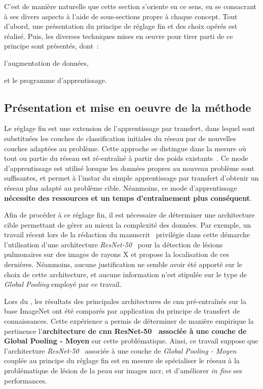 C'est de manière naturelle que cette section s'oriente en ce sens, en se consacrant à ses divers aspects à l'aide de sous-sections propre à chaque concept. Tout d'abord, une présentation du principe de réglage fin et des choix opérés est réalisé. Puis, les diverses techniques mises en œuvre pour tirer parti de ce principe sont présentés, dont~:
\begin{inlinerate}
    \item l'augmentation de données,
    \item et le programme d'apprentissage.
\end{inlinerate}\par

\subsection{Présentation et mise en oeuvre de la méthode}
Le réglage fin est une extension de l'apprentissage par transfert, dans lequel sont substituées les couches de classification initiales du réseau par de nouvelles couches adaptées au problème. Cette approche se distingue dans la mesure où tout ou partie du réseau est ré-entraîné à partir des poids existants~\cite{Tajbakhsh2016}. Ce mode d'apprentissage est utilisé lorsque les données propres au nouveau problème sont suffisantes, et permet à l'instar du simple apprentissage par transfert d'obtenir un réseau plus adapté au problème cible. Néanmoins, ce mode d'apprentissage \textbf{nécessite des ressources et un temps d'entraînement plus conséquent}.\par

Afin de procéder à ce réglage fin, il est nécessaire de déterminer une architecture cible permettant de gérer au mieux la complexité des données. Par exemple, un travail récent lors de la rédaction du manuscrit~\cite{Park2019} privilégie dans cette démarche l'utilisation d'une architecture \textit{ResNet-50}~\cite{He2016} pour la détection de lésions pulmonaires sur des images de rayons X et propose la localisation de ces dernières. Néanmoins, aucune justification ne semble avoir été apporté sur le choix de cette architecture, et aucune information n'est stipulée sur le type de \textit{Global Pooling} employé par ce travail.\par

Lors du , les résultats des principales architectures de \gls{cnn} pré-entraînés sur la base ImageNet ont été comparés par application du principe de transfert de connaissances. Cette expérience a permis de déterminer de manière empirique la pertinence l'\textbf{architecture de \gls{cnn} ResNet-50~\cite{He2016} associée à une couche de Global Pooling - Moyen} sur cette problématique. Ainsi, ce travail suppose que l'architecture \textit{ResNet-50}~\cite{He2016} associée à une couche de \textit{Global Pooling - Moyen} couplée au principe du réglage fin est en mesure de spécialiser le réseau à la problématique de lésion de la peau sur images \gls{mcr}, et d'améliorer \textit{in fine} ses performances.\par

